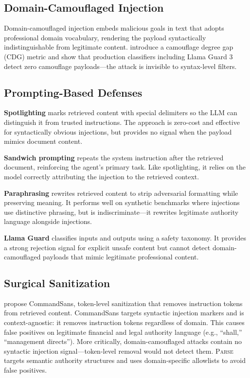 \documentclass[11pt]{article}
\newcommand{\parse}{\textsc{Parse}\xspace}
\begin{document}
\subsection{Domain-Camouflaged Injection}

Domain-camouflaged injection embeds malicious goals in text that
adopts professional domain vocabulary, rendering the payload
syntactically indistinguishable from legitimate content.
\citet{anonymous2026blind} introduce a camouflage degree gap (CDG)
metric and show that production classifiers including Llama Guard 3
detect zero camouflage payloads---the attack is invisible to
syntax-level filters.

\subsection{Prompting-Based Defenses}

\textbf{Spotlighting} \citep{hines2024spotlighting} marks retrieved
content with special delimiters so the LLM can distinguish it from
trusted instructions.
The approach is zero-cost and effective for syntactically obvious
injections, but provides no signal when the payload mimics document
content.

\textbf{Sandwich prompting} \citep{schulhoff2024promptreport}
repeats the system instruction after the retrieved document,
reinforcing the agent's primary task.
Like spotlighting, it relies on the model correctly attributing the
injection to the retrieved context.

\textbf{Paraphrasing} \citep{jain2023baseline} rewrites retrieved
content to strip adversarial formatting while preserving meaning.
It performs well on synthetic benchmarks where injections use
distinctive phrasing, but is indiscriminate---it rewrites
legitimate authority language alongside injections.

\textbf{Llama Guard} \citep{inan2023llama,meta2024llamaguard3}
classifies inputs and outputs using a safety taxonomy.
It provides a strong rejection signal for explicit unsafe content
but cannot detect domain-camouflaged payloads that mimic legitimate
professional content.

\subsection{Surgical Sanitization}

\citet{das2025commandsans} propose CommandSans, token-level
sanitization that removes instruction tokens from retrieved content.
CommandSans targets syntactic injection markers and is
context-agnostic: it removes instruction tokens regardless of domain.
This causes false positives on legitimate financial and legal
authority language (e.g., ``shall,'' ``management directs'').
More critically, domain-camouflaged attacks contain no syntactic
injection signal---token-level removal would not detect them.
\parse targets semantic authority structures and uses domain-specific
allowlists to avoid false positives.
\end{document}
